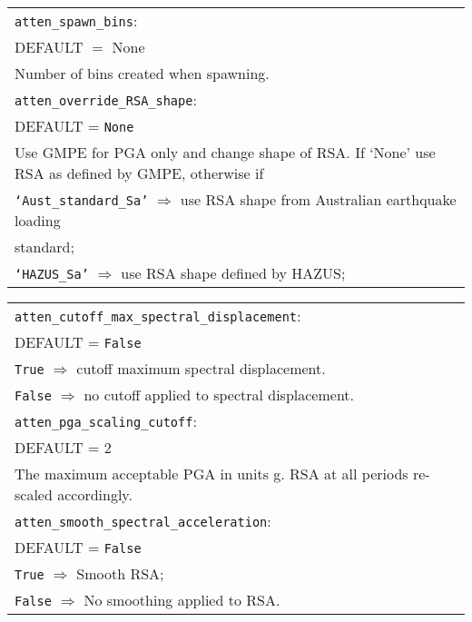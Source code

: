 \begin{tabular}{|p{\textwidth}|}
\vspace{0.1em} \texttt{atten\_spawn\_bins}: \\
DEFAULT $=$ None \\
Number of bins created when spawning. \\
\hline
\hline \vspace{0.1em} \texttt{atten\_override\_RSA\_shape}: \\
DEFAULT = \texttt{None} \\
Use GMPE for PGA only and change shape of RSA. If `None' use RSA
as defined by GMPE, otherwise if\\
 \hspace{0.5em} \texttt{`Aust\_standard\_Sa'} $\Rightarrow$
use RSA shape from Australian earthquake loading \\
\hspace{11em} standard; \\
 \hspace{0.5em} \texttt{`HAZUS\_Sa'}  $\Rightarrow$ use RSA shape defined by HAZUS;\\
\hline
\end{tabular}

\begin{tabular}{|p{\textwidth}|}
\hline
 \hspace{0.5em} \texttt{atten\_cutoff\_max\_spectral\_displacement}: \\
DEFAULT = \texttt{False} \\
\hspace{0.5em} \texttt{True} $\Rightarrow$ cutoff maximum spectral displacement. \\
\hspace{0.5em} \texttt{False} $\Rightarrow$ no cutoff applied to spectral displacement. \\
\hline \vspace{0.1em} \texttt{atten\_pga\_scaling\_cutoff}: \\
DEFAULT = 2 \\
The maximum acceptable PGA in units g. RSA at all periods re-scaled accordingly.      \\
\hline \vspace{0.1em}
\texttt{atten\_smooth\_spectral\_acceleration}: \\
DEFAULT = \texttt{False} \\
\hspace{0.5em} \texttt{True} $\Rightarrow$  Smooth RSA; \\
\hspace{0.5em} \texttt{False} $\Rightarrow$  No smoothing applied to RSA. \\
\hline
 \end{tabular}

